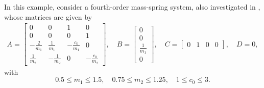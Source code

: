 \documentclass[english,11pt]{article}
\theoremstyle{break} \theorembodyfont{\small\rm}
\begin{document}
In this example, consider a fourth-order mass-spring system, also investigated
in \cite{OP:08b}, whose matrices are given by
\begin{align*}
 A = \begin{bmatrix}
      0 & 0 & 1 & 0 \\
      0 & 0 & 0 & 1 \\
      -\frac{2}{m_1} & \frac{1}{m_1} & -\frac{c_0}{m_1} & 0 \\
      \frac{1}{m_2} & -\frac{1}{m_2} & 0 & -\frac{c_0}{m_2}
     \end{bmatrix}, \quad
 B = \begin{bmatrix} 0 \\ 0 \\ \frac{1}{m_1} \\ 0 \end{bmatrix}, \quad
 C = \begin{bmatrix} 0 & 1 & 0 & 0 \end{bmatrix}, \quad D = 0,
\end{align*}
with
\[
 0.5 \leq m_1 \leq 1.5, \quad 0.75 \leq m_2 \leq 1.25, \quad 1 \leq c_0 \leq 3.
\]
\end{document}
